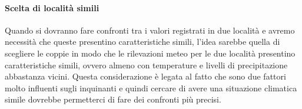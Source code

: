 \documentclass{article}
\begin{document}
\paragraph{Scelta di località simili}
Quando si dovranno fare confronti tra i valori registrati in due località e avremo necessità che queste presentino caratteristiche simili, l'idea sarebbe quella di scegliere le coppie in modo che le rilevazioni meteo per le due località presentino caratteristiche simili, ovvero almeno con temperature e livelli di precipitazione abbastanza vicini. Questa considerazione è legata al fatto che sono due fattori molto influenti sugli inquinanti e quindi cercare di avere una situazione climatica simile dovrebbe permetterci di fare dei confronti più precisi.
\newpage



\end{document}
